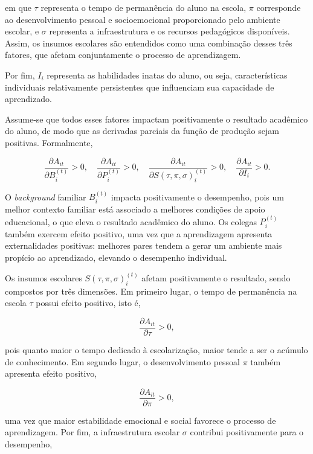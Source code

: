 em que $\tau$ representa o tempo de permanência do aluno na escola, $\pi$ corresponde ao desenvolvimento pessoal e socioemocional proporcionado pelo ambiente escolar, e $\sigma$ representa a infraestrutura e os recursos pedagógicos disponíveis. Assim, os insumos escolares são entendidos como uma combinação desses três fatores, que afetam conjuntamente o processo de aprendizagem.

Por fim, $I_i$ representa as habilidades inatas do aluno, ou seja, características individuais relativamente persistentes que influenciam sua capacidade de aprendizado.

Assume-se que todos esses fatores impactam positivamente o resultado acadêmico do aluno, de modo que as derivadas parciais da função de produção sejam positivas. Formalmente,

\begin{equation*}
\frac{\partial A_{it}}{\partial B_{i}^{(t)}} > 0, \quad
\frac{\partial A_{it}}{\partial P_{i}^{(t)}} > 0, \quad
\frac{\partial A_{it}}{\partial S(\tau,\pi,\sigma)_{i}^{(t)}} > 0, \quad
\frac{\partial A_{it}}{\partial I_{i}} > 0.
\end{equation*}

O \textit{background} familiar $B_{i}^{(t)}$ impacta positivamente o desempenho, pois um melhor contexto familiar está associado a melhores condições de apoio educacional, o que eleva o resultado acadêmico do aluno. Os colegas $P_{i}^{(t)}$ também exercem efeito positivo, uma vez que a aprendizagem apresenta externalidades positivas: melhores pares tendem a gerar um ambiente mais propício ao aprendizado, elevando o desempenho individual.

Os insumos escolares $S(\tau,\pi,\sigma)_{i}^{(t)}$ afetam positivamente o resultado, sendo compostos por três dimensões. Em primeiro lugar, o tempo de permanência na escola $\tau$ possui efeito positivo, isto é,

\begin{equation*}
\frac{\partial A_{it}}{\partial \tau} > 0,
\end{equation*}

pois quanto maior o tempo dedicado à escolarização, maior tende a ser o acúmulo de conhecimento. Em segundo lugar, o desenvolvimento pessoal $\pi$ também apresenta efeito positivo,

\begin{equation*}
\frac{\partial A_{it}}{\partial \pi} > 0,
\end{equation*}

uma vez que maior estabilidade emocional e social favorece o processo de aprendizagem. Por fim, a infraestrutura escolar $\sigma$ contribui positivamente para o desempenho,

